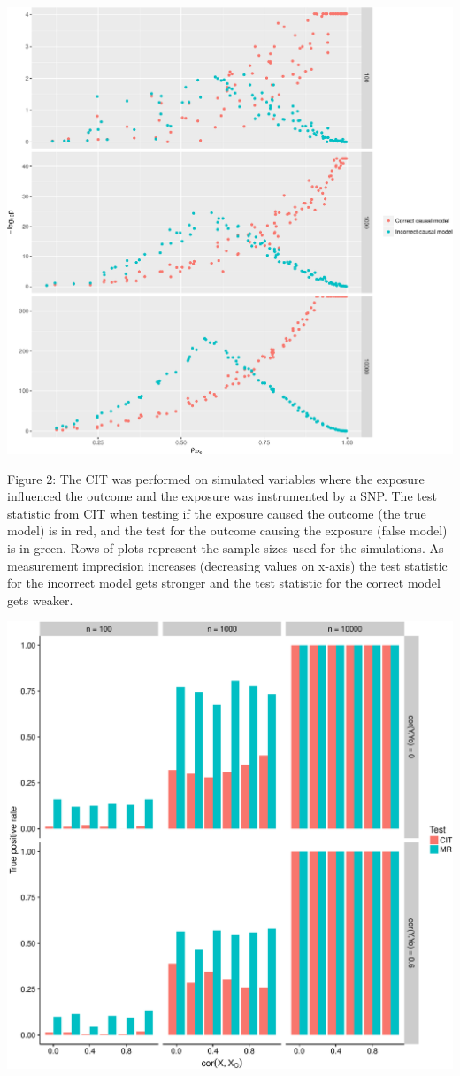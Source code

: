 \documentclass[]{article}
\begin{document}
\includegraphics{manuscript_files/figure-latex/cit_measurement_error_figure-1.pdf}

Figure 2: The CIT was performed on simulated variables where the
exposure influenced the outcome and the exposure was instrumented by a
SNP. The test statistic from CIT when testing if the exposure caused the
outcome (the true model) is in red, and the test for the outcome causing
the exposure (false model) is in green. Rows of plots represent the
sample sizes used for the simulations. As measurement imprecision
increases (decreasing values on x-axis) the test statistic for the
incorrect model gets stronger and the test statistic for the correct
model gets weaker.

\newpage

\includegraphics{manuscript_files/figure-latex/causality_exists_tpr-1.pdf}
\end{document}
